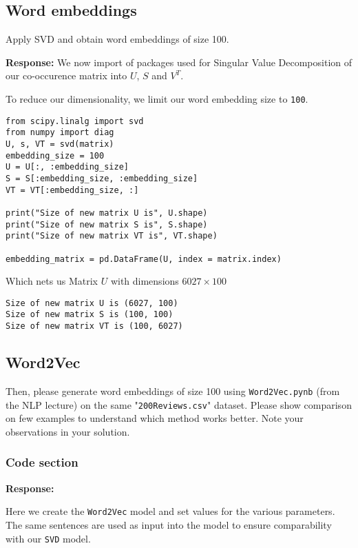 \documentclass[12pt, letterpaper]{article}
\newcommand{\mybox}[1]{\par\noindent\colorbox{shadecolor}
{\parbox{\dimexpr\textwidth-2\fboxsep\relax}{#1}}}
\begin{document}
\subsection{Word embeddings}
\mybox{Apply SVD and obtain word embeddings of size 100.}

\textbf{Response:} We now import of packages used for Singular Value Decomposition of our co-occurence matrix into $U$, $S$ and $V^T$.

To reduce our dimensionality, we limit our word embedding size to \texttt{100}.

\begin{mdframed}[backgroundcolor=shadecolor]
\begin{verbatim}
from scipy.linalg import svd
from numpy import diag
U, s, VT = svd(matrix)
embedding_size = 100
U = U[:, :embedding_size]
S = S[:embedding_size, :embedding_size]
VT = VT[:embedding_size, :]

print("Size of new matrix U is", U.shape)
print("Size of new matrix S is", S.shape)
print("Size of new matrix VT is", VT.shape)

embedding_matrix = pd.DataFrame(U, index = matrix.index)
\end{verbatim}
\end{mdframed}

Which nets us Matrix $U$ with dimensions $6027\times 100$

\begin{lstlisting}
Size of new matrix U is (6027, 100)
Size of new matrix S is (100, 100)
Size of new matrix VT is (100, 6027)
\end{lstlisting}

\subsection{Word2Vec}

\mybox{Then, please generate word embeddings of size 100 using \texttt{Word2Vec.pynb} (from the NLP lecture) on the same "\texttt{200Reviews.csv}" dataset. 
Please show comparison on few examples to understand which method works better. Note your observations in your solution.}

\subsubsection{Code section}

\textbf{Response:}

Here we create the \texttt{Word2Vec} model and set values for the various parameters.
The same sentences are used as input into the model to ensure comparability with our \texttt{SVD} model.
\end{document}
